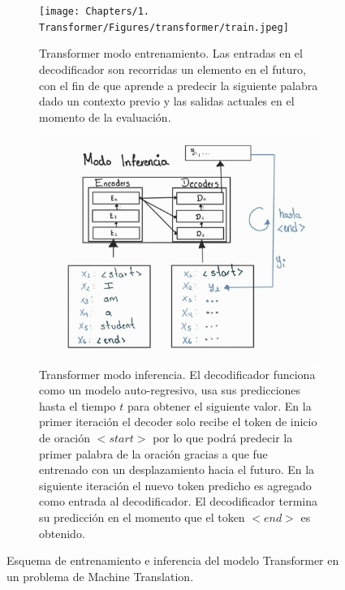 \begin{figure}[ht!]
    \centering
    \begin{subfigure}[b]{0.49\textwidth}
        \centering
        \texttt{[image: Chapters/1. Transformer/Figures/transformer/train.jpeg]}
        \caption{Transformer modo entrenamiento. Las entradas en el decodificador son recorridas un
                 elemento en el futuro, con el fin de que aprende a predecir la siguiente palabra
                 dado un contexto previo y las salidas actuales en el momento de la evaluación.}
        \label{fig:trans_train}
    \end{subfigure}
    \begin{subfigure}[b]{0.49\textwidth}
        \centering
        \includegraphics[width=1.0 \textwidth]{Chapters/1. Transformer/Figures/transformer/inference.jpg}
        \caption{Transformer modo inferencia. El decodificador funciona como un modelo auto-regresivo,
        usa sus predicciones hasta el tiempo $t$ para obtener el siguiente valor. En la primer iteración
        el decoder solo recibe el token de inicio de oración $<start>$ por lo que podrá predecir la primer
        palabra de la oración gracias a que fue entrenado con un desplazamiento hacia el futuro. En la siguiente
        iteración el nuevo token predicho es agregado como entrada al decodificador. El decodificador
        termina su predicción en el momento que el token $<end>$ es obtenido.}
        \label{fig:trans_eval}
    \end{subfigure}
    \caption{Esquema de entrenamiento e inferencia del modelo Transformer en un problema de
             Machine Translation.}
        \label{fig:trans_te}
\end{figure}


